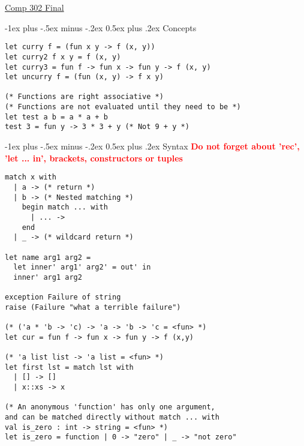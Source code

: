 \documentclass[12pt]{article}
\makeatletter
\renewcommand{\section}{\@startsection{section}{1}{0mm}%
                                    {-1ex plus -.5ex minus -.2ex}%
                                    {0.5ex plus .2ex}%
                                    {\normalfont\large\bfseries\color{header}}}
\makeatother
\begin{document}
\raggedright
\footnotesize
\begin{multicols}{2}


	\setlength{\premulticols}{1pt}
	\setlength{\postmulticols}{1pt}
	\setlength{\multicolsep}{10pt}
	\setlength{\columnsep}{2pt}



	\begin{center}
		\Large{\underline{Comp 302 Final}} \\
	\end{center}

	\section{Concepts}
	\begin{lstlisting}
let curry f = (fun x y -> f (x, y))
let curry2 f x y = f (x, y)
let curry3 = fun f -> fun x -> fun y -> f (x, y)
let uncurry f = (fun (x, y) -> f x y)

(* Functions are right associative *)
(* Functions are not evaluated until they need to be *)
let test a b = a * a + b
test 3 = fun y -> 3 * 3 + y (* Not 9 + y *)
	\end{lstlisting}


    \section{Syntax}
    \textcolor{red}{\textbf{Do not forget about 'rec', 'let ... in', brackets, constructors or tuples}}
	\begin{lstlisting}
match x with
  | a -> (* return *)
  | b -> (* Nested matching *)
    begin match ... with 
      | ... ->
    end
  | _ -> (* wildcard return *)
  
let name arg1 arg2 =
  let inner' arg1' arg2' = out' in
  inner' arg1 arg2
  
exception Failure of string
raise (Failure "what a terrible failure")

(* ('a * 'b -> 'c) -> 'a -> 'b -> 'c = <fun> *)
let cur = fun f -> fun x -> fun y -> f (x,y)

(* 'a list list -> 'a list = <fun> *)
let first lst = match lst with
  | [] -> []
  | x::xs -> x

(* An anonymous 'function' has only one argument,
and can be matched directly without match ... with
val is_zero : int -> string = <fun> *)
let is_zero = function | 0 -> "zero" | _ -> "not zero"


\end{lstlisting}
\end{multicols}
\end{document}
